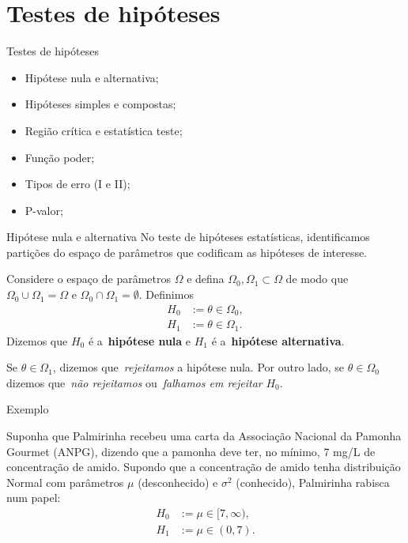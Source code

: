 \section{Testes de hipóteses}
\begin{frame}{Testes de hipóteses}
 \begin{itemize}
  \item Hipótese nula e alternativa;
  \item Hipóteses simples e compostas;
  \item Região crítica e estatística teste;
  \item Função poder;
  \item Tipos de erro (I e II);
  \item P-valor;
   \end{itemize}
\end{frame}

\begin{frame}{Hipótese nula e alternativa}
 No teste de hipóteses estatísticas, identificamos partições do espaço de parâmetros que codificam as hipóteses de interesse.
 \begin{defn}
  Considere o espaço de parâmetros $\Omega$ e defina $\Omega_0, \Omega_1 \subset \Omega$ de modo que $\Omega_0 \cup \Omega_1 = \Omega$ e $\Omega_0 \cap \Omega_1 = \emptyset$.
  Definimos
  \begin{align*}
   H_0 &:= \theta \in \Omega_0,\\
   H_1 &:= \theta \in \Omega_1.
  \end{align*}
Dizemos que $H_0$ é a~\textbf{hipótese nula} e $H_1$ é a~\textbf{hipótese alternativa}.

Se $\theta \in \Omega_1$, dizemos que~\textit{rejeitamos} a hipótese nula.
Por outro lado, se $\theta \in \Omega_0$ dizemos que~\textit{não rejeitamos} ou~\textit{falhamos em rejeitar} $H_0$.
 \end{defn}
\end{frame}

\begin{frame}{Exemplo}

Suponha que Palmirinha recebeu uma carta da Associação Nacional da Pamonha Gourmet (ANPG), dizendo que a pamonha deve ter, no mínimo, 7 mg/L de concentração de amido.
Supondo que a concentração de amido tenha distribuição Normal com parâmetros $\mu$ (desconhecido) e $\sigma^2$ (conhecido), Palmirinha rabisca num papel:
  \begin{align*}
   H_0 &:= \mu \in [7, \infty),\\
   H_1 &:= \mu \in (0, 7).
  \end{align*}
\end{frame}

